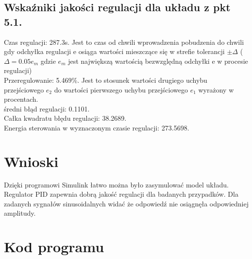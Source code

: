 \documentclass[a4paper]{article}
\begin{document}
\subsection{Wskaźniki jakości regulacji dla układu z pkt 5.1.}
Czas regulacji: 287.3s. Jest to czas od chwili wprowadzenia pobudzenia do chwili gdy odchyłka regulacji e osiąga wartości mieszczące się w strefie tolerancji $\pm\Delta$ ($\Delta=0.05e_m$ gdzie $e_m$ jest największą  wartością bezwzględną odchyłki e w procesie regulacji) \\
Przeregulowanie: 5.469\%. Jest to stosunek wartości drugiego uchybu przejściowego $e_2$ do wartości pierwszego uchybu przejściowego $e_{1}$  wyrażony w procentach.\\
średni błąd regulacji: 0.1101. \\
Całka kwadratu błędu regulacji: 38.2689. \\
Energia sterowania w wyznaczonym czasie regulacji: 273.5698. \\
\section{Wnioski}

Dzięki programowi Simulink łatwo można było zasymulować model układu.
Regulator PID zapewnia dobrą jakość regulacji dla badanych przypadków.
Dla zadanych sygnałów sinusoidalnych widać że odpowiedź nie osiągnęła odpowiedniej amplitudy.
\section{Kod programu}
\end{document}
